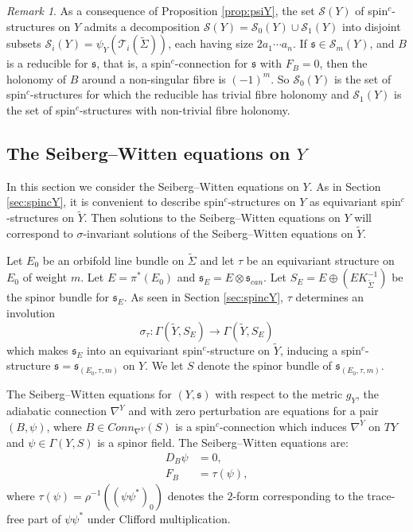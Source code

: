 \documentclass{amsart}
\theoremstyle{definition}
\theoremstyle{remark}
\newtheorem{remark}[theorem]{Remark}
\numberwithin{equation}{section}
\begin{document}
\begin{remark}
As a consequence of Proposition \ref{prop:psiY}, the set $\mathcal{S}(Y)$ of spin$^c$-structures on $Y$ admits a decomposition $\mathcal{S}(Y) = \mathcal{S}_0(Y) \cup \mathcal{S}_1(Y)$ into disjoint subsets $\mathcal{S}_i(Y) = \psi_Y( \mathcal{T}_i(\widetilde{\Sigma}))$, each having size $2a_1 \cdots a_n$. If $\mathfrak{s} \in \mathcal{S}_m(Y)$, and $B$ is a reducible for $\mathfrak{s}$, that is, a spin$^c$-connection for $\mathfrak{s}$ with $F_B = 0$, then the holonomy of $B$ around a non-singular fibre is $(-1)^m$. So $\mathcal{S}_0(Y)$ is the set of spin$^c$-structures for which the reducible has trivial fibre holonomy and $\mathcal{S}_1(Y)$ is the set of spin$^c$-structures with non-trivial fibre holonomy.
\end{remark}




\subsection{The Seiberg--Witten equations on $Y$}\label{equ:swe}

In this section we consider the Seiberg--Witten equations on $Y$. As in Section \ref{sec:spincY}, it is convenient to describe spin$^c$-structures on $Y$ as equivariant spin$^c$-structures on $\widetilde{Y}$. Then solutions to the Seiberg--Witten equations on $Y$ will correspond to $\sigma$-invariant solutions of the Seiberg--Witten equations on $\widetilde{Y}$.

Let $E_0$ be an orbifold line bundle on $\widetilde{\Sigma}$ and let $\tau$ be an equivariant structure on $E_0$ of weight $m$. Let $E = \pi^*(E_0)$ and $\mathfrak{s}_E = E \otimes \mathfrak{s}_{can}$. Let $S_E = E \oplus (EK_{\widetilde{\Sigma}}^{-1})$ be the spinor bundle for $\mathfrak{s}_E$. As seen in Section \ref{sec:spincY}, $\tau$ determines an involution
\[
\sigma_\tau : \Gamma( \widetilde{Y} , S_E) \to \Gamma( \widetilde{Y} , S_E)
\]
which makes $\mathfrak{s}_E$ into an equivariant spin$^c$-structure on $\widetilde{Y}$, inducing a spin$^c$-structure $\mathfrak{s} = \mathfrak{s}_{(E_0 , \tau , m)}$ on $Y$. We let $S$ denote the spinor bundle of $\mathfrak{s}_{(E_0 , \tau , m)}$.

The Seiberg--Witten equations for $(Y , \mathfrak{s})$ with respect to the metric $g_Y$, the adiabatic connection $\nabla^Y$ and with zero perturbation are equations for a pair $( B , \psi )$, where $B \in Conn_{\nabla^Y}(S)$ is a spin$^c$-connection which induces $\nabla^Y$ on $TY$ and $\psi \in \Gamma( Y , S )$ is a spinor field. The Seiberg--Witten equations are:
\begin{align*}
D_B \psi &= 0, \\
F_B &= \tau(\psi),
\end{align*}
where $\tau(\psi) = \rho^{-1}( (\psi \psi^*)_0 )$ denotes the $2$-form corresponding to the trace-free part of $\psi \psi^*$ under Clifford multiplication.
\end{document}

